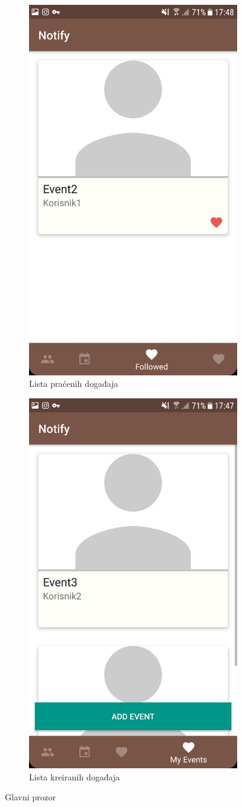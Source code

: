 \documentclass[times, utf8, zavrsni]{fer}
\begin{document}
\begin{figure}
\begin{subfigure}{0.5\linewidth}
	\centering    
    \includegraphics[width=0.45\linewidth]{img/ss-event-list-followed.png} 
    \caption{Lista praćenih događaja}
    \label{fig:event-list-followed-image}
\end{subfigure}%
\begin{subfigure}{0.5\linewidth}
	\centering
    \includegraphics[width=0.45\linewidth]{img/ss-event-list-my.png} 
    \caption{Lista kreiranih događaja}
    \label{fig:event-list-my-image}
\end{subfigure}%
\caption{Glavni prozor}
\label{fig:main-activity-image}
\end{figure}
\end{document}
